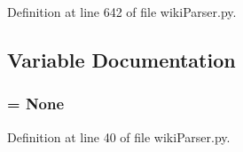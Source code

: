 \-Definition at line 642 of file wiki\-Parser.\-py.



\subsection{\-Variable \-Documentation}
\hypertarget{namespaceuicilibris_1_1wikiParser_aab08ad37f3f58300726ef29403cd6a22}{
\subsubsection[{w\-Parser}]{ = \-None}}\label{namespaceuicilibris_1_1wikiParser_aab08ad37f3f58300726ef29403cd6a22}


\-Definition at line 40 of file wiki\-Parser.\-py.

